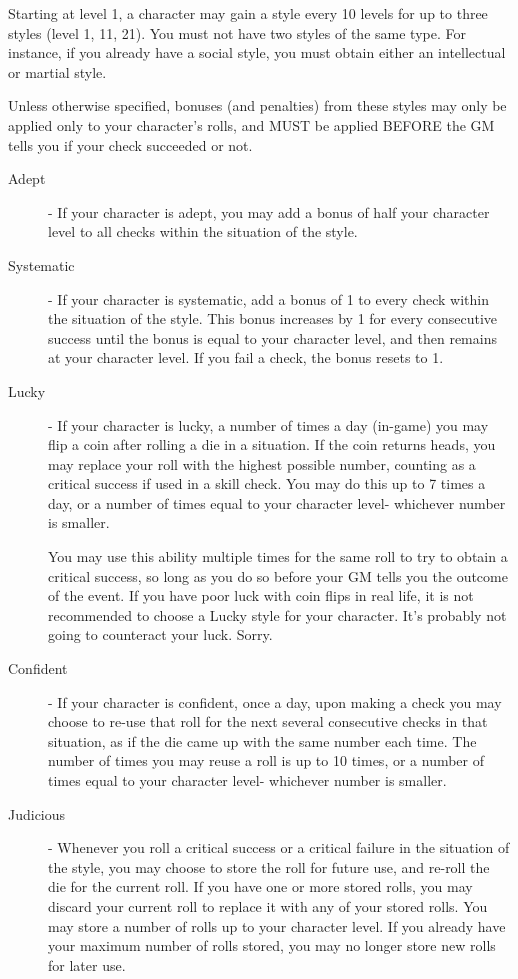Starting at level 1, a character may gain a style every 10 levels for up to three styles (level 1, 11, 21). You must not have two styles of the same type. For instance, if you already have a social style, you must obtain either an intellectual or martial style.

Unless otherwise specified, bonuses (and penalties) from these styles may only be applied only to your character's rolls, and MUST be applied BEFORE the GM tells you if your check succeeded or not.

\begin{description}
\item[Adept] - If your character is adept, you may add a bonus of half your character level to all checks within the situation of the style.

\item[Systematic] - If your character is systematic, add a bonus of 1 to every check within the situation of the style. This bonus increases by 1 for every consecutive success until the bonus is equal to your character level, and then remains at your character level. If you fail a check, the bonus resets to 1.

\item[Lucky] - If your character is lucky, a number of times a day (in-game) you may flip a coin after rolling a die in a situation. If the coin returns heads, you may replace your roll with the highest possible number, counting as a critical success if used in a skill check. You may do this up to 7 times a day, or a number of times equal to your character level- whichever number is smaller.

You may use this ability multiple times for the same roll to try to obtain a critical success, so long as you do so before your GM tells you the outcome of the event. If you have poor luck with coin flips in real life, it is not recommended to choose a Lucky style for your character. It's probably not going to counteract your luck. Sorry.

\item[Confident] - If your character is confident, once a day, upon making a check you may choose to re-use that roll for the next several consecutive checks in that situation, as if the die came up with the same number each time. The number of times you may reuse a roll is up to 10 times, or a number of times equal to your character level- whichever number is smaller.

\item[Judicious] - Whenever you roll a critical success or a critical failure in the situation of the style, you may choose to store the roll for future use, and re-roll the die for the current roll. If you have one or more stored rolls, you may discard your current roll to replace it with any of your stored rolls. You may store a number of rolls up to your character level. If you already have your maximum number of rolls stored, you may no longer store new rolls for later use.


\end{description}
